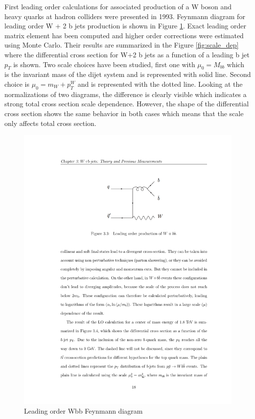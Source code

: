 \par First leading order calculations for associated production of a W boson and heavy quarks at hadron colliders were presented in 1993. Feynmann diagram for leading order W + 2 b jets production is shown in Figure \ref{fig:LO_diag}. Exact leading order matrix element has been computed and higher order corrections were estimated using Monte Carlo. Their results are summarized in the Figure \ref{fig:scale_dep} where the differential cross section for W+2 b jets as a function of a leading b jet $p_T$ is shown. Two scale choices have been studied, first one with $\mu_0=M_{bb}$ which is the invariant mass of the dijet system and is represented with solid line. Second choice is $\mu_0=m_W+p_T^W$ and is represented with the dotted line. Looking at the normalizations of two diagrams, the difference is clearly visible which indicates a strong total cross section scale dependence. However, the shape of the differential cross section shows the same behavior in both cases which means that the scale only affects total cross section.      
\begin{figure}[htbp]
	\centering
		\includegraphics{Figures/LO_diag.pdf}
	\caption[Leading order Wbb Feynmann diagram]{Leading order Wbb Feynmann diagram}
	\label{fig:LO_diag}
\end{figure}
